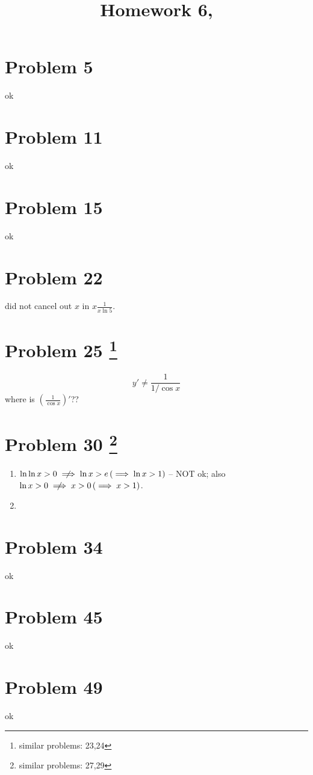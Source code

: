 \documentclass[10pt]{article} %
\title{Homework 6,
}
\begin{document}
\maketitle

\section*{Problem 5 }
ok
\section*{Problem 11 }
ok
\section*{Problem 15 }
ok
\section*{Problem 22 }
did not cancel out $x$ in $\displaystyle x\frac{1}{x\ln 5}$.
\section*{Problem 25 \footnote{similar problems: 23,24}}
\begin{equation*}
	y'\neq\frac{1}{1/\cos x}
\end{equation*}
where is $\displaystyle\left( \frac{1}{\cos x} \right)'$??
\section*{Problem 30  \footnote{similar problems: 27,29}}
\begin{enumerate}[I]
	\item $\ln\ln x>0 \centernot\implies \ln x>e \left( \implies \ln x>1 \right)$ -- NOT ok; also 
		$\ln x>0\centernot\implies  x>0 \left( \implies x>1 \right)$.
	\item 
\end{enumerate}
\section*{Problem 34 }
ok
\section*{Problem 45 }
ok
\section*{Problem 49 }
ok
\end{document}
